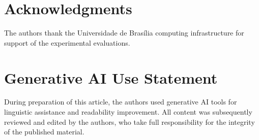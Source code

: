 \documentclass[a4paper,fleqn]{cas-dc}
\begin{document}
\section*{Acknowledgments}
The authors thank the Universidade de Bras\'ilia computing infrastructure
for support of the experimental evaluations.
\begin{sloppypar}
\section*{Generative AI Use Statement}
During preparation of this article, the authors used generative AI tools
for linguistic assistance and readability improvement. All content was
subsequently reviewed and edited by the authors, who take full
responsibility for the integrity of the published material.
\end{sloppypar}


\end{document}
